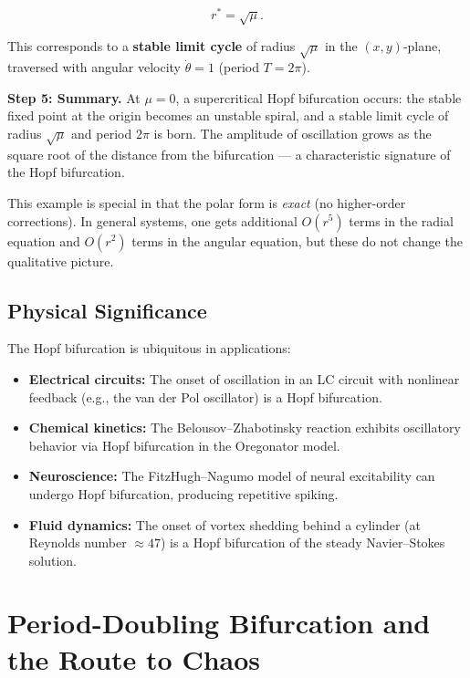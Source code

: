 \[
r^* = \sqrt{\mu}.
\]

This corresponds to a \textbf{stable limit cycle} of radius $\sqrt{\mu}$ in the $(x, y)$-plane, traversed with angular velocity $\dot{\theta} = 1$ (period $T = 2\pi$).

\textbf{Step 5: Summary.} At $\mu = 0$, a supercritical Hopf bifurcation occurs: the stable fixed point at the origin becomes an unstable spiral, and a stable limit cycle of radius $\sqrt{\mu}$ and period $2\pi$ is born. The amplitude of oscillation grows as the square root of the distance from the bifurcation --- a characteristic signature of the Hopf bifurcation.

This example is special in that the polar form is \textit{exact} (no higher-order corrections). In general systems, one gets additional $O(r^5)$ terms in the radial equation and $O(r^2)$ terms in the angular equation, but these do not change the qualitative picture.

\subsection{Physical Significance}\label{sec:5.4.4}

The Hopf bifurcation is ubiquitous in applications:

\begin{itemize}[nosep]
  \item \textbf{Electrical circuits:} The onset of oscillation in an LC circuit with nonlinear feedback (e.g., the van der Pol oscillator) is a Hopf bifurcation.
  \item \textbf{Chemical kinetics:} The Belousov--Zhabotinsky reaction exhibits oscillatory behavior via Hopf bifurcation in the Oregonator model.
  \item \textbf{Neuroscience:} The FitzHugh--Nagumo model of neural excitability can undergo Hopf bifurcation, producing repetitive spiking.
  \item \textbf{Fluid dynamics:} The onset of vortex shedding behind a cylinder (at Reynolds number $\approx 47$) is a Hopf bifurcation of the steady Navier--Stokes solution.


\bigskip

\end{itemize}

\section{Period-Doubling Bifurcation and the Route to Chaos}\label{sec:5.5}

